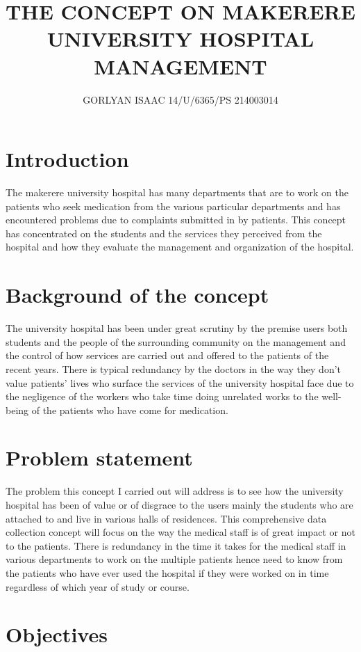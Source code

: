 \documentclass[12]{article}
\begin{document}
\title{THE CONCEPT ON MAKERERE UNIVERSITY HOSPITAL MANAGEMENT}
\maketitle
\author{GORLYAN ISAAC   14/U/6365/PS    214003014}

\section{Introduction}
The makerere university hospital has many departments that are to work on the patients who seek medication from the various particular departments and has encountered problems due to complaints submitted in by patients. This concept has concentrated on the students and the services they perceived from the hospital and how they evaluate the management and organization of the hospital.

\section{Background of the concept}
The university hospital has been under great scrutiny by the premise users both students and the people of the surrounding community on the management and the control of how services are carried out and offered to the patients of the recent years. There is typical redundancy by the doctors in the way they don’t value patients’ lives  who surface the services of the university hospital face due to the negligence of the workers who take time doing unrelated works to the well-being of the patients who have come for medication.

\section{Problem statement}
The problem this concept I carried out will address is to see how the university hospital has been of value or of disgrace to the users mainly the students who are attached to and live in various halls of residences. This comprehensive data collection concept will focus on the way the medical staff is of great impact or not to the patients.
There is redundancy in the time it takes for the medical staff in various departments to work on the multiple patients hence need to know from the patients who have ever used the hospital if they were worked on in time regardless of which year of study or course.

\section{Objectives}
\end{document}
